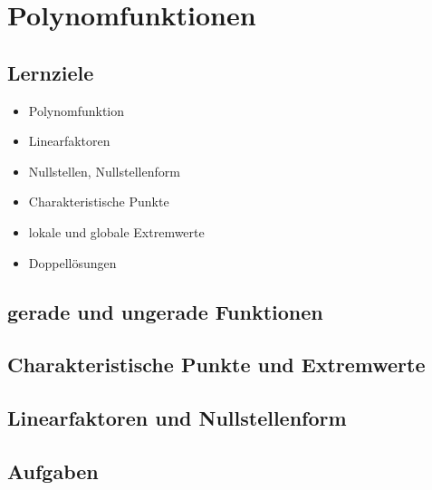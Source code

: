 
\section{Polynomfunktionen}

\subsection*{Lernziele}

\begin{itemize}
\item Polynomfunktion
\item Linearfaktoren
\item Nullstellen, Nullstellenform
\item Charakteristische Punkte
\item lokale und globale Extremwerte
\item Doppellösungen
\end{itemize}


\subsection{gerade und ungerade Funktionen}


\subsection{Charakteristische Punkte und Extremwerte}


\subsection{Linearfaktoren und Nullstellenform}


\subsection*{Aufgaben}




\newpage

